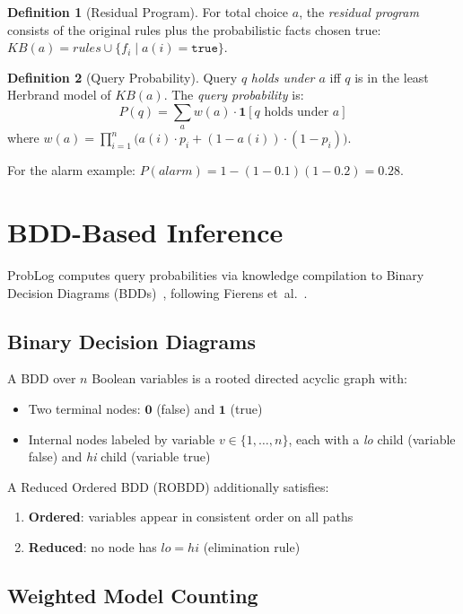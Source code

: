 \documentclass[11pt,a4paper]{article}
\theoremstyle{definition}
\newtheorem{definition}{Definition}[section]
\begin{document}
\begin{definition}[Residual Program]
For total choice $a$, the \emph{residual program} consists of the original
rules plus the probabilistic facts chosen true: $\mathit{KB}(a) = \mathit{rules} \cup \{f_i \mid a(i) = \texttt{true}\}$.
\end{definition}

\begin{definition}[Query Probability]
Query $q$ \emph{holds under $a$} iff $q$ is in the least Herbrand model of $\mathit{KB}(a)$.
The \emph{query probability} is:
\[
P(q) = \sum_{a} w(a) \cdot \mathbf{1}[q \text{ holds under } a]
\]
where $w(a) = \prod_{i=1}^{n} \bigl(a(i) \cdot p_i + (1-a(i)) \cdot (1-p_i)\bigr)$.
\end{definition}

For the alarm example: $P(\mathit{alarm}) = 1 - (1-0.1)(1-0.2) = 0.28$.

\section{BDD-Based Inference}

ProbLog computes query probabilities via knowledge compilation to Binary
Decision Diagrams (BDDs)~\cite{bryant1986}, following Fierens et~al.~\cite{fierens2015}.

\subsection{Binary Decision Diagrams}

A BDD over $n$ Boolean variables is a rooted directed acyclic graph with:
\begin{itemize}
\item Two terminal nodes: $\mathbf{0}$ (false) and $\mathbf{1}$ (true)
\item Internal nodes labeled by variable $v \in \{1,\ldots,n\}$, each with
  a \emph{lo} child (variable false) and \emph{hi} child (variable true)
\end{itemize}

A Reduced Ordered BDD (ROBDD) additionally satisfies:
\begin{enumerate}
\item \textbf{Ordered}: variables appear in consistent order on all paths
\item \textbf{Reduced}: no node has $\mathit{lo} = \mathit{hi}$ (elimination rule)
\end{enumerate}

\subsection{Weighted Model Counting}
\end{document}
